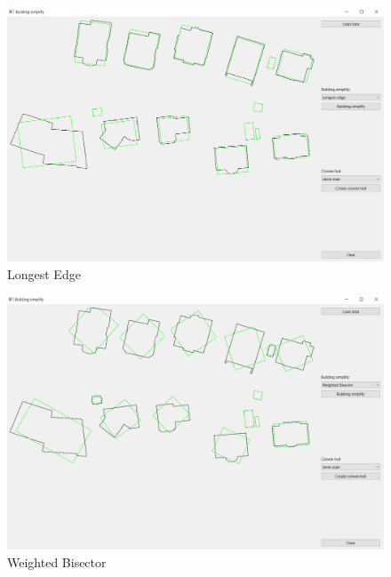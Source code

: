 \documentclass[11pt]{article}
\begin{document}
		\begin{figure}[htbh]
			\centering
			\includegraphics[scale=0.4]{images/U2_aplikace_LongestEdge.png} 
			\caption{Longest Edge}
			\label{fig:app_LongestEdge}
		\end{figure} \begin{figure}[htbh]
			\centering
			\includegraphics[scale=0.4]{images/U2_aplikace_WeightedBisector.png} 
			\caption{Weighted Bisector}
			\label{fig:app_WeightedBisector}
		\end{figure} 
		
		\clearpage
		
\end{document}
